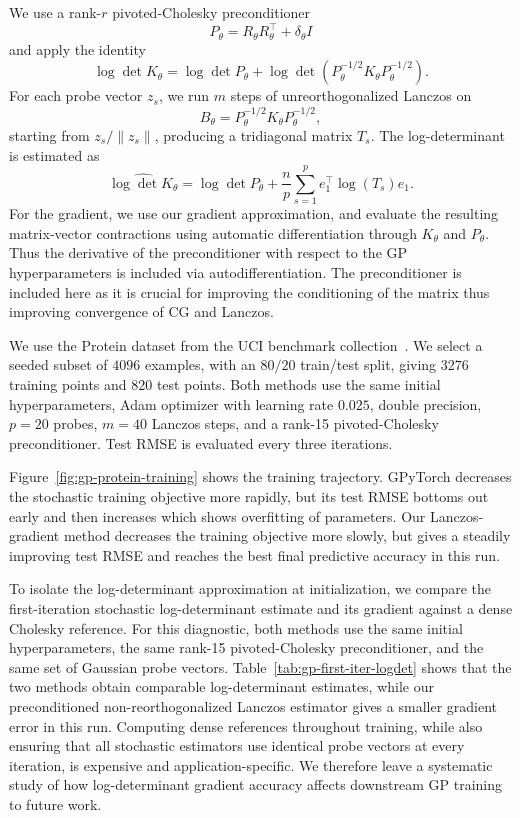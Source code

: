 \documentclass{article}
\begin{document}
We use a rank-\(r\) pivoted-Cholesky preconditioner
\[
    P_\theta = R_\theta R_\theta^\top + \delta_\theta I
\]
and apply the identity
\[
    \log\det K_\theta
    =
    \log\det P_\theta
    +
    \log\det\!\left(P_\theta^{-1/2}K_\theta P_\theta^{-1/2}\right).
\]
For each probe vector \(z_s\), we run \(m\) steps of unreorthogonalized Lanczos
on
\[
    B_\theta = P_\theta^{-1/2}K_\theta P_\theta^{-1/2},
\]
starting from \(z_s/\|z_s\|\), producing a tridiagonal matrix \(T_s\). The
log-determinant is estimated as
\[
    \widehat{\log\det K_\theta}
    =
    \log\det P_\theta
    +
    \frac{n}{p}\sum_{s=1}^{p}
    e_1^\top \log(T_s)e_1 .
\]
For the gradient, we use our gradient approximation, and evaluate the resulting matrix-vector contractions using automatic
differentiation through \(K_\theta\) and \(P_\theta\). Thus the derivative of the
preconditioner with respect to the GP hyperparameters is included via autodifferentiation. The preconditioner is included here as it is crucial for improving the conditioning of the matrix thus improving convergence of CG and Lanczos.

We use the Protein dataset from the UCI benchmark collection~\citep{rana2013protein}.
We select a seeded
subset of \(4096\) examples, with an \(80/20\) train/test split, giving
\(3276\) training points and \(820\) test points. Both methods use the same
initial hyperparameters, Adam optimizer with learning rate \(0.025\), double
precision, \(p=20\) probes, \(m=40\) Lanczos steps, and a rank-15
pivoted-Cholesky preconditioner. Test RMSE is evaluated every three iterations.

Figure~\ref{fig:gp-protein-training} shows the training trajectory. GPyTorch
decreases the stochastic training objective more rapidly, but its test RMSE
bottoms out early and then increases which shows overfitting of parameters. Our Lanczos-gradient
method decreases the training objective more slowly, but gives a steadily
improving test RMSE and reaches the best final predictive accuracy in this run. 

To isolate the log-determinant approximation at initialization, we compare the
first-iteration stochastic log-determinant estimate and its gradient against a
dense Cholesky reference. For this diagnostic, both methods use the same initial
hyperparameters, the same rank-15 pivoted-Cholesky preconditioner, and the same
set of Gaussian probe vectors. Table~\ref{tab:gp-first-iter-logdet} shows that
the two methods obtain comparable log-determinant estimates, while our
preconditioned non-reorthogonalized Lanczos estimator gives a smaller gradient
error in this run. Computing dense references throughout training, while also ensuring that all
stochastic estimators use identical probe vectors at every iteration, is
expensive and application-specific. We therefore leave a systematic study of how
log-determinant gradient accuracy affects downstream GP training to future work.
\end{document}
